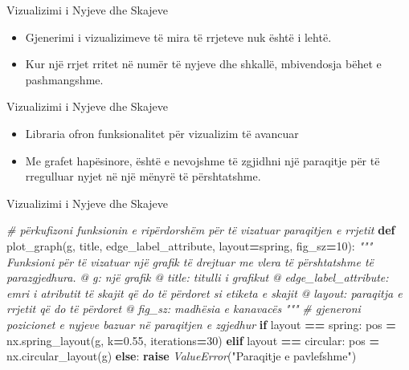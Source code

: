 \documentclass[
  ignorenonframetext,
]{beamer}
\newenvironment{Shaded}{\begin{snugshade}}{\end{snugshade}}
\newcommand{\CommentTok}[1]{\textcolor[rgb]{0.56,0.35,0.01}{\textit{#1}}}
\newcommand{\ControlFlowTok}[1]{\textcolor[rgb]{0.13,0.29,0.53}{\textbf{#1}}}
\newcommand{\DecValTok}[1]{\textcolor[rgb]{0.00,0.00,0.81}{#1}}
\newcommand{\FloatTok}[1]{\textcolor[rgb]{0.00,0.00,0.81}{#1}}
\newcommand{\KeywordTok}[1]{\textcolor[rgb]{0.13,0.29,0.53}{\textbf{#1}}}
\newcommand{\NormalTok}[1]{#1}
\newcommand{\OperatorTok}[1]{\textcolor[rgb]{0.81,0.36,0.00}{\textbf{#1}}}
\newcommand{\PreprocessorTok}[1]{\textcolor[rgb]{0.56,0.35,0.01}{\textit{#1}}}
\newcommand{\StringTok}[1]{\textcolor[rgb]{0.31,0.60,0.02}{#1}}
\begin{document}
\begin{frame}{Vizualizimi i Nyjeve dhe Skajeve}
\protect\hypertarget{vizualizimi-i-nyjeve-dhe-skajeve}{}
\begin{itemize}
\item
  Gjenerimi i vizualizimeve të mira të rrjeteve nuk është i lehtë.
\item
  Kur një rrjet rritet në numër të nyjeve dhe shkallë, mbivendosja bëhet
  e pashmangshme.
\end{itemize}
\end{frame}

\begin{frame}{Vizualizimi i Nyjeve dhe Skajeve}
\protect\hypertarget{vizualizimi-i-nyjeve-dhe-skajeve-1}{}
\begin{itemize}
\item
  Libraria ofron funksionalitet për vizualizim të avancuar
\item
  Me grafet hapësinore, është e nevojshme të zgjidhni një paraqitje për
  të rregulluar nyjet në një mënyrë të përshtatshme.
\end{itemize}
\end{frame}

\begin{frame}[fragile]{Vizualizimi i Nyjeve dhe Skajeve}
\protect\hypertarget{vizualizimi-i-nyjeve-dhe-skajeve-2}{}

\begin{Shaded}
\begin{Highlighting}[]
\CommentTok{\# përkufizoni funksionin e ripërdorshëm për të vizatuar paraqitjen e rrjetit}
\KeywordTok{def}\NormalTok{ plot\_graph(g, title, edge\_label\_attribute, layout}\OperatorTok{=}\StringTok{\textquotesingle{}spring\textquotesingle{}}\NormalTok{, fig\_sz}\OperatorTok{=}\DecValTok{10}\NormalTok{):}
    \CommentTok{"""}
\CommentTok{    Funksioni për të vizatuar një grafik të drejtuar me vlera të përshtatshme të parazgjedhura.}
\CommentTok{    @ g: një grafik}
\CommentTok{    @ title: titulli i grafikut}
\CommentTok{    @ edge\_label\_attribute: emri i atributit të skajit që do të përdoret si etiketa e skajit}
\CommentTok{    @ layout: paraqitja e rrjetit që do të përdoret}
\CommentTok{    @ fig\_sz: madhësia e kanavacës}
\CommentTok{    """}
    \CommentTok{\# gjeneroni pozicionet e nyjeve bazuar në paraqitjen e zgjedhur}
    \ControlFlowTok{if}\NormalTok{ layout }\OperatorTok{==} \StringTok{\textquotesingle{}spring\textquotesingle{}}\NormalTok{:}
\NormalTok{        pos }\OperatorTok{=}\NormalTok{ nx.spring\_layout(g, k}\OperatorTok{=}\FloatTok{0.55}\NormalTok{, iterations}\OperatorTok{=}\DecValTok{30}\NormalTok{)}
    \ControlFlowTok{elif}\NormalTok{ layout }\OperatorTok{==} \StringTok{\textquotesingle{}circular\textquotesingle{}}\NormalTok{:}
\NormalTok{        pos }\OperatorTok{=}\NormalTok{ nx.circular\_layout(g)}
    \ControlFlowTok{else}\NormalTok{:}
        \ControlFlowTok{raise} \PreprocessorTok{ValueError}\NormalTok{(}\StringTok{"Paraqitje e pavlefshme"}\NormalTok{)}
\end{Highlighting}
\end{Shaded}
\end{frame}
\end{document}
